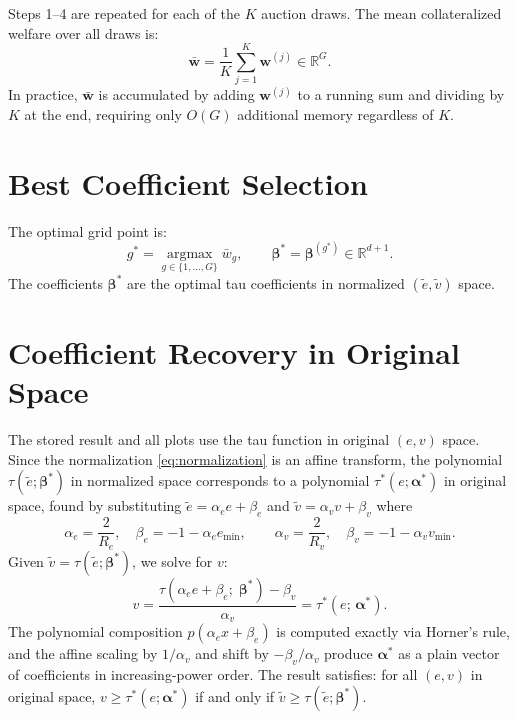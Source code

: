 \documentclass[11pt]{article}
\newcommand{\tv}{\tilde{v}}
\newcommand{\te}{\tilde{e}}
\newcommand{\bsbeta}{\boldsymbol{\beta}}
\begin{document}
Steps 1--4 are repeated for each of the $K$ auction draws.
The mean collateralized welfare over all draws is:
\begin{equation}
    \bar{\mathbf{w}} = \frac{1}{K} \sum_{j=1}^{K} \mathbf{w}^{(j)} \in \mathbb{R}^{G}.
    \label{eq:mean_welfare}
\end{equation}
In practice, $\bar{\mathbf{w}}$ is accumulated by adding $\mathbf{w}^{(j)}$
to a running sum and dividing by $K$ at the end, requiring only $O(G)$
additional memory regardless of $K$.

\section{Best Coefficient Selection}

The optimal grid point is:
\begin{equation}
    g^* = \operatorname*{argmax}_{g \in \{1,\ldots,G\}} \bar{w}_g,
    \qquad
    \bsbeta^* = \bsbeta^{(g^*)} \in \mathbb{R}^{d+1}.
    \label{eq:argmax}
\end{equation}
The coefficients $\bsbeta^*$ are the optimal tau coefficients in
normalized $(\te, \tilde{v})$ space.

\section{Coefficient Recovery in Original Space}

The stored result and all plots use the tau function in original $(e, v)$ space.
Since the normalization \eqref{eq:normalization} is an affine transform, the
polynomial $\tau(\te;\bsbeta^*)$ in normalized space corresponds to a polynomial
$\tau^*(e;\boldsymbol{\alpha}^*)$ in original space, found by substituting
$\te = \alpha_e e + \beta_e$ and $\tilde{v} = \alpha_v v + \beta_v$ where
\begin{equation}
    \alpha_e = \frac{2}{R_e}, \quad \beta_e = -1 - \alpha_e e_{\min}, \qquad
    \alpha_v = \frac{2}{R_v}, \quad \beta_v = -1 - \alpha_v v_{\min}.
\end{equation}
Given $\tilde{v} = \tau(\te;\bsbeta^*)$, we solve for $v$:
\begin{equation}
    v = \frac{\tau(\alpha_e e + \beta_e;\;\bsbeta^*) - \beta_v}{\alpha_v}
      = \tau^*(e;\,\boldsymbol{\alpha}^*).
    \label{eq:recovery}
\end{equation}
The polynomial composition $p(\alpha_e x + \beta_e)$ is computed exactly
via Horner's rule, and the affine scaling by $1/\alpha_v$ and shift by
$-\beta_v/\alpha_v$ produce $\boldsymbol{\alpha}^*$ as a plain vector of
coefficients in increasing-power order.
The result satisfies:
for all $(e, v)$ in original space,
$v \geq \tau^*(e;\boldsymbol{\alpha}^*)$ if and only if
$\tv \geq \tau(\te;\bsbeta^*)$.
\end{document}
